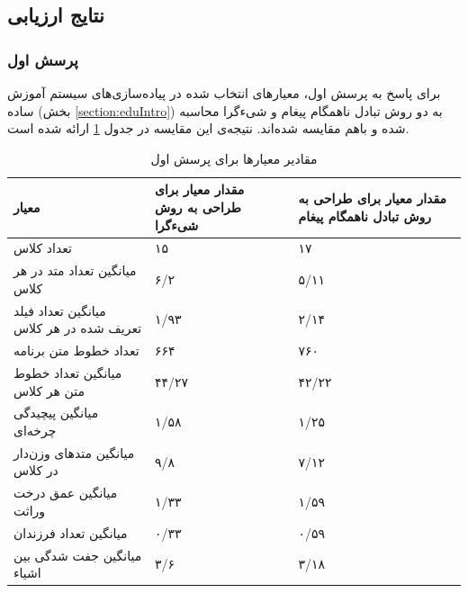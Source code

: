 \subsection{نتایج ارزیابی}
\subsubsection{پرسش اول}
برای پاسخ به پرسش اول، معیارهای انتخاب شده در پیاده‌سازی‌های سیستم آموزش ساده (بخش \ref{section:eduIntro}) به دو روش تبادل ناهمگام پیغام و شیءگرا محاسبه شده و باهم مقایسه شده‌اند. نتیجه‌ی این مقایسه در جدول \ref{table:mod_result_1} ارائه شده است.


\begin{table}[ht]
\small
\begin{center}
\begin{tabular}{|p{7cm}|p{4cm}|p{4cm}|}
	\hline
\textbf{معیار} & \textbf{مقدار معیار برای طراحی به روش شیءگرا} & \textbf{مقدار معیار برای طراحی به روش تبادل ناهمگام پیغام} 
\\ 
	\hline
	تعداد کلاس
	 &
	 ۱۵
	 &
 ۱۷
\\
	\hline
	میانگین تعداد متد در هر کلاس
	 &
	 ۶/۲
	 &
	 ۵/۱۱
\\
	\hline
	میانگین تعداد فیلد تعریف شده در هر کلاس
	 &
	 ۱/۹۳
	 &
	 ۲/۱۴
\\
	\hline

	تعداد خطوط متن برنامه
	 &
	 ۶۶۴
	 &
	 ۷۶۰
\\
	\hline
	
		میانگین تعداد خطوط متن هر کلاس
	 &
	 ۴۴/۲۷
	 &
	 ۴۲/۲۲
\\
	\hline
	
		میانگین پیچیدگی چرخه‌ای
	 &
	 ۱/۵۸
	 &
	 ۱/۲۵
\\
	\hline
	
		میانگین متدهای وزن‌دار در کلاس
	 &
	 ۹/۸
	 &
	 ۷/۱۲
\\
	\hline
	
		میانگین عمق درخت وراثت
	 &
	 ۱/۳۳
	 &
	 ۱/۵۹
\\
	\hline
	
		میانگین تعداد فرزندان
	 &
	 ۰/۳۳
	 &
	 ۰/۵۹
\\
	\hline
	
			میانگین جفت شدگی بین اشیاء
	 &
	 ۳/۶
	 &
	 ۳/۱۸
\\
	\hline
\end{tabular}
\caption{\label{table:mod_result_1} مقادیر معیارها برای پرسش اول}
\end{center}
\end{table}
\FloatBarrier
